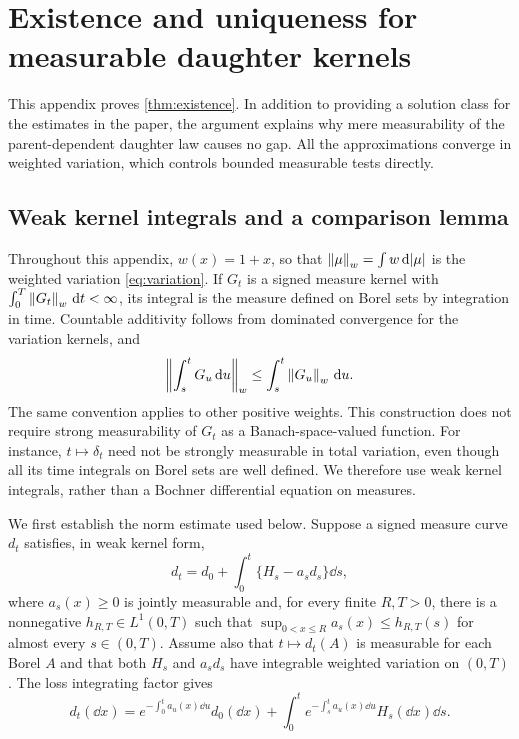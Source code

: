 \section{Existence and uniqueness for measurable daughter kernels}
\label{app:existence}

This appendix proves \cref{thm:existence}. In addition to providing a
solution class for the estimates in the paper, the argument explains why
mere measurability of the parent-dependent daughter law causes no gap.
All the approximations converge in weighted variation, which controls
bounded measurable tests directly.

\subsection{Weak kernel integrals and a comparison lemma}

Throughout this appendix, $w(x)=1+x$, so that
$\left\lVert \mu\right\rVert_w=\int w\,\mathrm d|\mu|$ is the weighted variation \eqref{eq:variation}.
If $G_t$ is a signed measure kernel with
$\int_0^T\left\lVert G_t\right\rVert_w\,\mathrm d t<\infty$, its integral is the measure defined
on Borel sets by integration in time. Countable additivity follows from
dominated convergence for the variation kernels, and
\begin{equation}
 \left\lVert \int_s^tG_u\,\mathrm d u\right\rVert_w\leq\int_s^t\left\lVert G_u\right\rVert_w\,\mathrm d u.
 \label{eq:kernel-integral}
\end{equation}
The same convention applies to other positive weights.
This construction does not require strong measurability of $G_t$ as a
Banach-space-valued function. For instance, $t\mapsto\delta_t$ need not
be strongly measurable in total variation, even though all its time
integrals on Borel sets are well defined. We therefore use weak kernel
integrals, rather than a Bochner differential equation on measures.

We first establish the norm estimate used below. Suppose a signed
measure curve $d_t$ satisfies, in weak kernel form,
\begin{equation}
 d_t=d_0+\int_0^t\{H_s-a_s d_s\}\dd s,
 \label{eq:signed-loss}
\end{equation}
where $a_s(x)\geq0$ is jointly measurable and, for every finite $R,T>0$,
there is a nonnegative $h_{R,T}\in L^1(0,T)$ such that
$\sup_{0<x\leq R}a_s(x)\leq h_{R,T}(s)$ for almost every $s\in(0,T)$.
Assume also that $t\mapsto d_t(A)$ is measurable for each Borel $A$ and
that both $H_s$ and $a_sd_s$ have integrable weighted variation on $(0,T)$.
The loss integrating factor gives
\begin{equation}
 d_t(\dd x)=e^{-\int_0^t a_u(x)\dd u}d_0(\dd x)
   +\int_0^t e^{-\int_s^t a_u(x)\dd u}H_s(\dd x)\dd s.
 \label{eq:loss-duhamel}
\end{equation}

